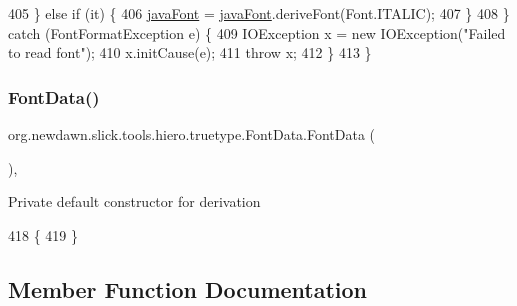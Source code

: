 \begin{DoxyCode}
405             \} \textcolor{keywordflow}{else} \textcolor{keywordflow}{if} (it) \{
406                 \mbox{\hyperlink{classorg_1_1newdawn_1_1slick_1_1tools_1_1hiero_1_1truetype_1_1_font_data_ab48e0ef57ae93083499407b9998d93a6}{javaFont}} = \mbox{\hyperlink{classorg_1_1newdawn_1_1slick_1_1tools_1_1hiero_1_1truetype_1_1_font_data_ab48e0ef57ae93083499407b9998d93a6}{javaFont}}.deriveFont(Font.ITALIC);
407             \}
408         \} \textcolor{keywordflow}{catch} (FontFormatException e) \{
409             IOException x = \textcolor{keyword}{new} IOException(\textcolor{stringliteral}{"Failed to read font"});
410             x.initCause(e);
411             \textcolor{keywordflow}{throw} x;
412         \}
413     \}
\end{DoxyCode}
\mbox{\label{classorg_1_1newdawn_1_1slick_1_1tools_1_1hiero_1_1truetype_1_1_font_data_a749bc5408e8c04106d580a31b5c9e597}} 
\subsubsection{\texorpdfstring{Font\+Data()}{FontData()}\hspace{0.1cm}{\footnotesize\ttfamily [2/2]}}
{\footnotesize\ttfamily org.\+newdawn.\+slick.\+tools.\+hiero.\+truetype.\+Font\+Data.\+Font\+Data (\begin{DoxyParamCaption}{ }\end{DoxyParamCaption})\hspace{0.3cm}{\ttfamily [inline]}, {\ttfamily [private]}}

Private default constructor for derivation 
\begin{DoxyCode}
418                        \{
419     \}
\end{DoxyCode}


\subsection{Member Function Documentation}
\mbox{\label{classorg_1_1newdawn_1_1slick_1_1tools_1_1hiero_1_1truetype_1_1_font_data_a32d549f946e2d1bb1405da459fdaf6ba}} 
